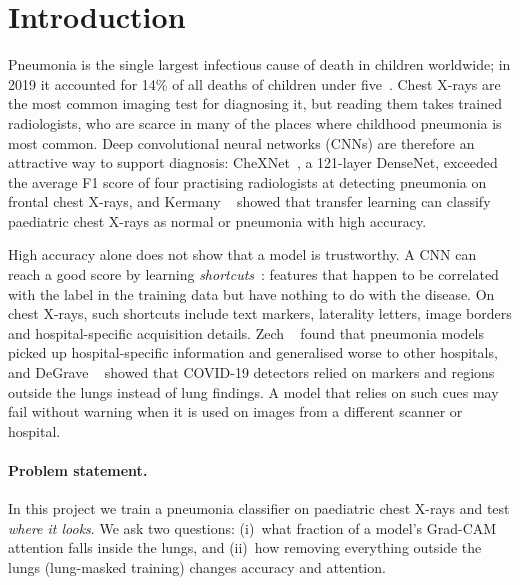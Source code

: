 \section{Introduction}
\label{sec:intro}

Pneumonia is the single largest infectious cause of death in children worldwide; in 2019 it accounted for 14\% of all deaths of children under five~\cite{who_pneumonia}.
Chest X-rays are the most common imaging test for diagnosing it, but reading them takes trained radiologists,
who are scarce in many of the places where childhood pneumonia is most common.
Deep convolutional neural networks (CNNs) are therefore an attractive way to support diagnosis:
CheXNet~\cite{rajpurkar2017chexnet}, a 121-layer DenseNet, exceeded the average F1 score of four practising radiologists at detecting pneumonia
on frontal chest X-rays, and Kermany \etal~\cite{kermany2018identifying} showed that transfer learning can classify paediatric chest X-rays as
normal or pneumonia with high accuracy.

High accuracy alone does not show that a model is trustworthy. A CNN can reach a good score by learning \emph{shortcuts}~\cite{geirhos2020shortcut}:
features that happen to be correlated with the label in the training data but have nothing to do with the disease.
On chest X-rays, such shortcuts include text markers, laterality letters, image borders and hospital-specific acquisition details.
Zech \etal~\cite{zech2018variable} found that pneumonia models picked up hospital-specific information and generalised worse to other hospitals,
and DeGrave \etal~\cite{degrave2021ai} showed that COVID-19 detectors relied on markers and regions outside the lungs instead of lung findings.
A model that relies on such cues may fail without warning when it is used on images from a different scanner or hospital.

\paragraph{Problem statement.}
In this project we train a pneumonia classifier on paediatric chest X-rays and test \emph{where it looks}.
We ask two questions:
(i)~what fraction of a model's Grad-CAM~\cite{selvaraju2017gradcam} attention falls inside the lungs, and
(ii)~how removing everything outside the lungs (lung-masked training) changes accuracy and attention.

